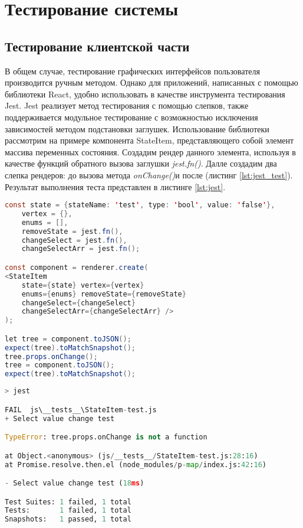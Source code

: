 \chapter{Тестирование системы}

\section{Тестирование клиентской части}

В общем случае, тестирование графических интерфейсов пользователя производится ручным методом. Однако для приложений, написанных с помощью библиотеки React, удобно использовать в качестве инструмента тестирования Jest. Jest реализует метод тестирования с помощью слепков, также поддерживается модульное тестирование с возможностью исключения зависимостей методом подстановки заглушек. Использование библиотеки рассмотрим на примере компонента StateItem, представляющего собой элемент массива переменных состояния. Создадим рендер данного элемента, используя в качестве функций обратного вызова заглушки \textit{jest.fn()}. Далле создадим два слепка рендеров: до вызова метода \textit{onChange()}и после (листинг \ref{lst:jest_test}). Результат выполнения теста представлен в листинге \ref{lst:jest}.

\begin{lstlisting}[language=Java, 
label=lst:jest_test, 
caption={Фрагмент теста для компонента StateItem.}]
const state = {stateName: 'test', type: 'bool', value: 'false'},
	vertex = {},
	enums = [],
	removeState = jest.fn(),
	changeSelect = jest.fn(),
	changeSelectArr = jest.fn();

const component = renderer.create(
<StateItem
	state={state} vertex={vertex}
	enums={enums} removeState={removeState}
	changeSelect={changeSelect}
	changeSelectArr={changeSelectArr} />
);

let tree = component.toJSON();
expect(tree).toMatchSnapshot();
tree.props.onChange();
tree = component.toJSON();
expect(tree).toMatchSnapshot();
\end{lstlisting}

\begin{lstlisting}[language=Python, 
label=lst:jest, 
caption={Фрагмент вывода сисетмы тестирования Jest.}]
> jest

FAIL  js\__tests__\StateItem-test.js
+ Select value change test

TypeError: tree.props.onChange is not a function

at Object.<anonymous> (js/__tests__/StateItem-test.js:28:16)
at Promise.resolve.then.el (node_modules/p-map/index.js:42:16)

- Select value change test (18ms)

Test Suites: 1 failed, 1 total
Tests:       1 failed, 1 total
Snapshots:   1 passed, 1 total
\end{lstlisting}

